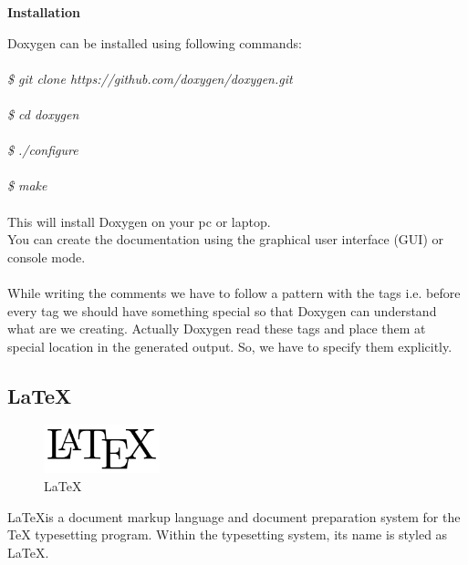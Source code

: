 \begin{center}
\textbf{Installation}
\end{center}
Doxygen can be installed using following commands:\\\\
\emph{
\$ git clone https://github.com/doxygen/doxygen.git\\\\
\$ cd doxygen\\\\
\$ ./configure\\\\
\$ make \\\\}
This will install Doxygen on your pc or laptop.\\
You can create the documentation using the graphical user interface (GUI) or console mode.\\\\
While writing the comments we have to follow a pattern with the tags i.e. before every tag we should have something special so that Doxygen can understand what are we creating. Actually Doxygen read these tags and place them at special location in the generated output. So, we have to specify them explicitly. 

\subsection{LaTeX}
\begin{figure}[!ht]
\centering
\includegraphics[width=0.3\textwidth]{input/images/latex.png}                   
\caption{\LaTeX} 
\hspace{-1.5em}
\end{figure}
\LaTeX is a document markup language and document preparation system for the \TeX{} 
typesetting program. Within the typesetting system, its name is styled 
as \LaTeX.

